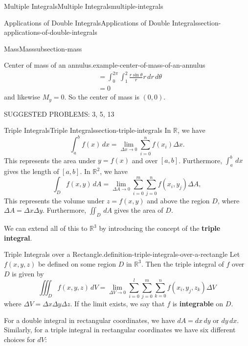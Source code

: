 \documentclass[oneside,10pt,]{book}
\newcommand{\terminology}[1]{\textbf{#1}}
\numberwithin{equation}{section}
\newcommand{\RR}{\mathbb{R}}
\begin{document}
\begin{chapterptx}{Multiple Integrals}{}{Multiple Integrals}{}{}{multiple-integrals}
\begin{sectionptx}{Applications of Double Integrals}{}{Applications of Double Integrals}{}{}{section-applications-of-double-integrals}
\begin{subsectionptx}{Mass}{}{Mass}{}{}{subsection-mass}
\begin{example}{Center of mass of an annulus.}{example-center-of-mass-of-an-annulus}
\begin{align*}
& = \int_{0}^{2\pi}\int_{1}^{2} \frac{r\sin\theta}{r}r\,dr\,d\theta \\
& = 0 
\end{align*}
and likewise \(M_{y} = 0\). So the center of mass is \((0,0)\).%
\end{example}
\end{subsectionptx}
\begin{conclusion}{}%
\hypertarget{p-1506}{}%
SUGGESTED PROBLEMS: 3, 5, 13%
\end{conclusion}%
\end{sectionptx}
%
%
\typeout{************************************************}
\typeout{************************************************}
%
\begin{sectionptx}{Triple Integrals}{}{Triple Integrals}{}{}{section-triple-integrals}
\hypertarget{p-1507}{}%
In \(\RR\), we have%
\begin{equation*}
\int_{a}^{b}f(x)\,dx = \lim_{\Delta x\to0}\sum_{i=0}^{n}f(x_{i})\Delta x.
\end{equation*}
This represents the area under \(y=f(x)\) and over \([a,b]\). Furthermore, \(\int_{a}^{b}\,dx\) gives the length of \([a,b]\). In \(\mathbb{R}^{2}\), we have%
\begin{equation*}
\int_{D}f(x,y)\,dA = \lim_{\Delta A\to0}\sum_{i=0}^{m}\sum_{j=0}^{n}f(x_{i},y_{j})\Delta A,
\end{equation*}
This represents the volume under \(z = f(x,y)\) and above the region \(D\), where \(\Delta A = \Delta x\Delta y\). Furthermore, \(\iint_{D}\,dA\) gives the area of \(D\).%
\par
\hypertarget{p-1508}{}%
We can extend all of this to \(\RR^{3}\) by introducing the concept of the \terminology{triple integral}.%
\begin{definition}{Triple Integrals over a Rectangle.}{definition-triple-integrals-over-a-rectangle}%
\hypertarget{p-1509}{}%
Let \(f(x,y,z)\) be defined on some region \(D\) in \(\RR^{3}\). Then the triple integral of \(f\) over \(D\) is given by%
\begin{equation*}
\iiint_{D}f(x,y,z)\,dV = \lim_{\Delta V\to0}\sum_{i=0}^{l}\sum_{j=0}^{m}\sum_{k=0}^{n}f(x_{i},y_{j},z_{k})\Delta V
\end{equation*}
where \(\Delta V = \Delta x\Delta y\Delta z\). If the limit exists, we say that \(f\) is \terminology{integrable} on \(D\).%
\end{definition}
\hypertarget{p-1510}{}%
For a double integral in rectangular coordinates, we have \(dA = dx\,dy\) or \(dy\,dx\). Similarly, for a triple integral in rectangular coordinates we have six different choices for \(dV\): \begin{table}

\end{table}
\end{sectionptx}
\end{chapterptx}
\end{document}
